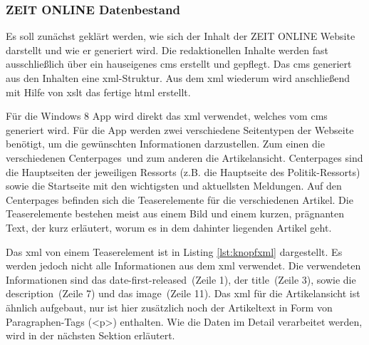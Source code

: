 \documentclass[12pt,a4paper,bibtotoc,abstracton]{scrartcl}
\begin{document}
\subsubsection{ZEIT ONLINE Datenbestand}
\label{subsubsec:zondatenbestand}
Es soll zunächst geklärt werden, wie sich der Inhalt der ZEIT ONLINE Website darstellt und wie er generiert wird. Die redaktionellen Inhalte werden fast ausschließlich über ein hauseigenes \ac{cms} erstellt und gepflegt. Das \ac{cms} generiert aus den Inhalten eine \ac{xml}-Struktur. Aus dem \ac{xml} wiederum wird anschließend mit Hilfe von \ac{xslt} das fertige \ac{html} erstellt.

Für die Windows 8 App wird direkt das \ac{xml} verwendet, welches vom \ac{cms} generiert wird. Für die App werden zwei verschiedene Seitentypen der Webseite benötigt, um die gewünschten Informationen darzustellen. Zum einen die verschiedenen \glqq Centerpages\grqq\ und zum anderen die Artikelansicht. Centerpages sind die Hauptseiten der jeweiligen Ressorts (z.B. die Hauptseite des Politik-Ressorts) sowie die Startseite mit den wichtigsten und aktuellsten Meldungen. Auf den Centerpages befinden sich die Teaserelemente für die verschiedenen Artikel. Die Teaserelemente bestehen meist aus einem Bild und einem kurzen, prägnanten Text, der kurz erläutert, worum es in dem dahinter liegenden Artikel geht.\\

\begin{minipage}{\linewidth}

\end{minipage}

Das \ac{xml} von einem Teaserelement ist in Listing \ref{lst:knopfxml} dargestellt. Es werden jedoch nicht alle Informationen aus dem \ac{xml} verwendet. Die verwendeten Informationen sind das \glqq date-first-released\grqq\ (Zeile 1), der \glqq title\grqq\ (Zeile 3), sowie die \glqq description\grqq\ (Zeile 7) und das \glqq image\grqq\ (Zeile 11). Das \ac{xml} für die Artikelansicht ist ähnlich aufgebaut, nur ist hier zusätzlich noch der Artikeltext in Form von Paragraphen-Tags (<p>) enthalten. Wie die Daten im Detail verarbeitet werden, wird in der nächsten Sektion erläutert.
\end{document}
